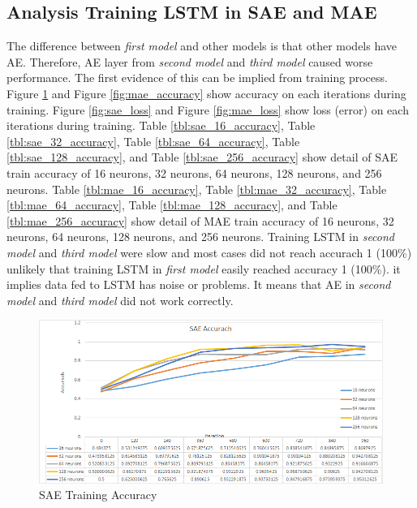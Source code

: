 \documentclass[draft,dvipsnames]{drexel-thesis}
\begin{document}
\begin{thesis}
\subsection{Analysis Training LSTM in SAE and MAE}
The difference between {\em first model} and other models is that other models have AE. Therefore, AE layer from {\em second model} and {\em third model} caused worse performance. The first evidence of this can be implied from training process. Figure \ref{fig:sae_accuracy} and Figure \ref{fig:mae_accuracy} show accuracy on each iterations during training. Figure \ref{fig:sae_loss} and Figure \ref{fig:mae_loss} show loss (error) on each iterations during training. Table \ref{tbl:sae_16_accuracy}, Table \ref{tbl:sae_32_accuracy}, Table \ref{tbl:sae_64_accuracy}, Table \ref{tbl:sae_128_accuracy}, and Table \ref{tbl:sae_256_accuracy} show detail of SAE train accuracy of 16 neurons, 32 neurons, 64 neurons, 128 neurons, and 256 neurons. Table \ref{tbl:mae_16_accuracy}, Table \ref{tbl:mae_32_accuracy}, Table \ref{tbl:mae_64_accuracy}, Table \ref{tbl:mae_128_accuracy}, and Table \ref{tbl:mae_256_accuracy} show detail of MAE train accuracy of 16 neurons, 32 neurons, 64 neurons, 128 neurons, and 256 neurons. Training LSTM in {\em second model} and {\em third model} were slow and most cases did not reach accurach 1 (100\%) unlikely that training LSTM in {\em first model} easily reached accuracy 1 (100\%). it implies data fed to LSTM has noise or problems. It means that AE in {\em second model} and {\em third model} did not work correctly.

\begin{figure}[t!]
    \centering
    \includegraphics[width=\textwidth]{pictures/result_pictures/SAE_Accuracy.png}
    \caption{SAE Training Accuracy}
    \label{fig:sae_accuracy}
\end{figure}


\end{thesis}
\end{document}
